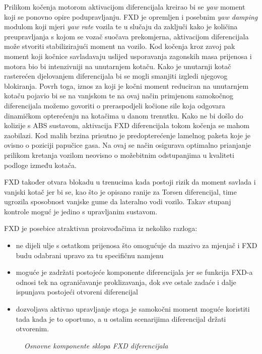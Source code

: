 \documentclass[11pt]{article}
\numberwithin{equation}{section}%
\begin{document}
Prilikom kočenja motorom aktivacijom diferencijala kreirao bi se \textit{yaw} moment koji se ponovno opire podupravljanju. FXD je opremljen i posebnim \textit{yaw damping} modulom koji mjeri \textit{yaw rate} vozila te u slučaju da zaključi kako je količina preupravljanja s kojom se vozač suočava prekomjerna, aktivacijom diferencijala može stvoriti stabilizirajući moment na vozilo. Kod kočenja kroz zavoj pak moment koji kočnice savladavaju uslijed usporavanja zagonskih masa prijenosa i motora bio bi intenzivniji na unutarnjem kotaču. Kako je unutarnji kotač rasterećen djelovanjem diferencijala bi se mogli smanjiti izgledi njegovog blokiranja. Povrh toga, iznos za koji je kočni moment reduciran na unutarnjem kotaču pojavio bi se na vanjskom te na ovaj način primjenom samokočnog diferencijala možemo govoriti o preraspodjeli kočione sile koja odgovara dinamičkom opterećenju na kotačima u danom trenutku. Kako ne bi došlo do kolizije s ABS sustavom, aktivacija FXD diferencijala tokom kočenja se mahom zaobilazi. Kod malih brzina prisutno je predopterećenje lamelnog paketa koje je ovisno o poziciji papučice gasa. Na ovaj se način osigurava optimalno prianjanje prilikom kretanja vozilom neovisno o možebitnim odstupanjima u kvaliteti podloge između kotača.

FXD također otvara blokadu u trenucima kada postoji rizik da moment savlada i vanjski kotač jer bi se, kao što je opisano ranije za Torsen diferencijal, time ugrozila sposobnost vanjske gume da lateralno vodi vozilo. Takav stupanj kontrole moguć je jedino s upravljanim sustavom.

FXD je posebice atraktivan proizvođačima iz nekoliko razloga:
\begin{itemize}
\item ne dijeli ulje s ostatkom prijenosa što omogućuje da mazivo za mjenjač i FXD budu odabrani upravo za tu specifičnu namjenu
\item moguće je zadržati postojeće komponente diferencijala jer se funkcija FXD-a odnosi tek na ograničavanje proklizavanja, dok sve ostale zadaće i dalje ispunjava postojeći otvoreni diferencijal
\item dozvoljava aktivno upravljanje stoga je samokočni moment moguće koristiti tada kada je to oportuno, a u ostalim scenarijima diferencijal držati otvorenim.
\end{itemize}

\begin{figure}
 \centering
 \def\svgwidth{13cm}
 
 \caption{\textit{Osnovne komponente sklopa FXD diferencijala} \cite{VW}}
 \label{fig:slikica}
\end{figure} 
\end{document}
